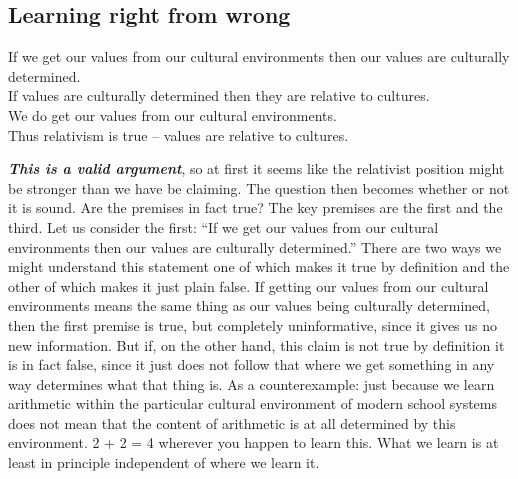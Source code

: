 \documentclass[12pt, openany]{book}
\begin{document}
\hypertarget{learning-right-from-wrong}{%
\subsection*{Learning right from wrong}\label{learning-right-from-wrong}}


\begin{center}

\begin{argument}

If we get our values from our cultural environments then our values are culturally determined.\\
If values are culturally determined then they are relative to cultures.\\
We do get our values from our cultural environments.\\

Thus relativism is true -- values are relative to cultures.

\end{argument}

\end{center}

\textbf{\emph{This is a valid argument}}, so at first it seems like the relativist position might be stronger than we have be claiming. The question then becomes whether or not it is sound. Are the premises in fact true? The key premises are the first and the third. Let us consider the first: ``If we get our values from our cultural environments then our values are culturally determined.'' There are two ways we might understand this statement one of which makes it true by definition and the other of which makes it just plain false. If getting our values from our cultural environments means the same thing as our values being culturally determined, then the first premise is true, but completely uninformative, since it gives us no new information. But if, on the other hand, this claim is not true by definition it is in fact false, since it just does not follow that where we get something in any way determines what that thing is. As a counterexample: just because we learn arithmetic within the particular cultural environment of modern school systems does not mean that the content of arithmetic is at all determined by this environment. 2 + 2 = 4 wherever you happen to learn this. What we learn is at least in principle independent of where we learn it.
\end{document}

